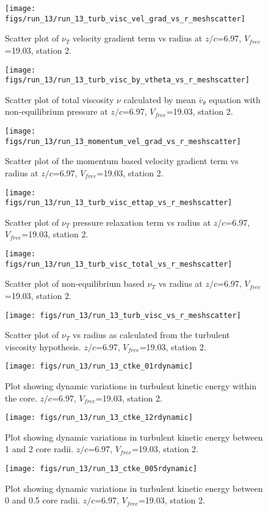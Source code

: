 \begin{figure}[H]
\centering
\texttt{[image: figs/run\_13/run\_13\_turb\_visc\_vel\_grad\_vs\_r\_meshscatter]}
\caption{Scatter plot of $\nu_T$ velocity gradient term vs radius at $z/c$=6.97, $V_{free}$=19.03, station 2.}
\end{figure}


\begin{figure}[H]
\centering
\texttt{[image: figs/run\_13/run\_13\_turb\_visc\_by\_vtheta\_vs\_r\_meshscatter]}
\caption{Scatter plot of total viscosity $\nu$ calculated by mean $\bar{v}_{\theta}$ equation with non-equilibrium pressure at $z/c$=6.97, $V_{free}$=19.03, station 2.}
\end{figure}


\begin{figure}[H]
\centering
\texttt{[image: figs/run\_13/run\_13\_momentum\_vel\_grad\_vs\_r\_meshscatter]}
\caption{Scatter plot of the momentum based velocity gradient term vs radius at $z/c$=6.97, $V_{free}$=19.03, station 2.}
\end{figure}


\begin{figure}[H]
\centering
\texttt{[image: figs/run\_13/run\_13\_turb\_visc\_ettap\_vs\_r\_meshscatter]}
\caption{Scatter plot of $\nu_T$ pressure relaxation term vs radius at $z/c$=6.97, $V_{free}$=19.03, station 2.}
\end{figure}


\begin{figure}[H]
\centering
\texttt{[image: figs/run\_13/run\_13\_turb\_visc\_total\_vs\_r\_meshscatter]}
\caption{Scatter plot of non-equilibrium based $\nu_T$ vs radius at $z/c$=6.97, $V_{free}$=19.03, station 2.}
\end{figure}


\begin{figure}[H]
\centering
\texttt{[image: figs/run\_13/run\_13\_turb\_visc\_vs\_r\_meshscatter]}
\caption{Scatter plot of $\nu_T$ vs radius as calculated from the turbulent viscosity hypothesis. $z/c$=6.97, $V_{free}$=19.03, station 2.}
\end{figure}


\begin{figure}[H]
\centering
\texttt{[image: figs/run\_13/run\_13\_ctke\_01rdynamic]}
\caption{Plot showing dynamic variations in turbulent kinetic energy within the core. $z/c$=6.97, $V_{free}$=19.03, station 2.}
\end{figure}


\begin{figure}[H]
\centering
\texttt{[image: figs/run\_13/run\_13\_ctke\_12rdynamic]}
\caption{Plot showing dynamic variations in turbulent kinetic energy between 1 and 2 core radii. $z/c$=6.97, $V_{free}$=19.03, station 2.}
\end{figure}


\begin{figure}[H]
\centering
\texttt{[image: figs/run\_13/run\_13\_ctke\_005rdynamic]}
\caption{Plot showing dynamic variations in turbulent kinetic energy between 0 and 0.5 core radii. $z/c$=6.97, $V_{free}$=19.03, station 2.}
\end{figure}


